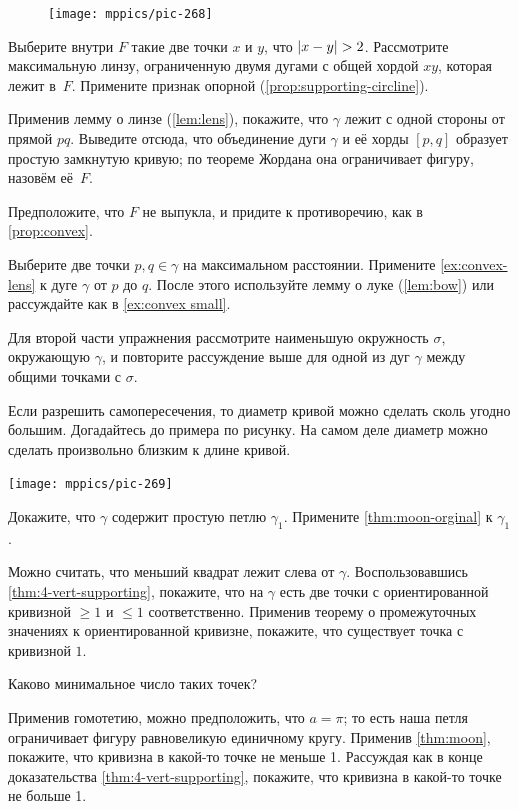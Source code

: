 \begin{multicols}{2}
\begin{figure}
\vskip-5mm
\centering
\texttt{[image: mppics/pic-268]}
\vskip0mm
\end{figure}

Выберите внутри $F$ такие две точки $x$ и $y$, что $|x\z-y|\z>2$.
Рассмотрите максимальную линзу, ограниченную двумя дугами с общей хордой $xy$, которая лежит в~$F$.
Примените признак опорной (\ref{prop:supporting-circline}).

Применив лемму о линзе (\ref{lem:lens}), покажите, что $\gamma$ лежит с одной стороны от прямой $pq$.
Выведите отсюда, что объединение дуги $\gamma$ и её хорды $[p,q]$ образует простую замкнутую кривую;
по теореме Жордана она ограничивает фигуру, назовём её~$F$.

Предположите, что $F$ не выпукла, и придите к противоречию, как в \ref{prop:convex}.

Выберите две точки $p,q\in\gamma$ на максимальном расстоянии.
Примените \ref{ex:convex-lens} к дуге $\gamma$ от $p$ до $q$.
После этого используйте лемму о луке (\ref{lem:bow}) или рассуждайте как в \ref{ex:convex small}.

Для второй части упражнения рассмотрите наименьшую окружность $\sigma$, окружающую $\gamma$, и повторите рассуждение выше для одной из дуг $\gamma$ между общими точками с $\sigma$.

Если разрешить самопересечения, то диаметр кривой можно сделать сколь угодно большим.
Догадайтесь до примера по рисунку.
На самом деле диаметр можно сделать произвольно близким к длине кривой.
\begin{Figure}
\vskip-0mm
\centering
\texttt{[image: mppics/pic-269]}
\vskip-0mm
\end{Figure}

Докажите, что $\gamma$ содержит простую петлю $\gamma_1$.
Примените \ref{thm:moon-orginal} к $\gamma_1$.

Можно считать, что меньший квадрат лежит слева от $\gamma$.
Воспользовавшись \ref{thm:4-vert-supporting}, покажите, что на $\gamma$ есть две точки с ориентированной кривизной $\ge 1$ и $\le 1$ соответственно.
Применив теорему о промежуточных значениях к ориентированной кривизне, покажите, что существует точка с кривизной $1$.

 Каково минимальное число таких точек?

Применив гомотетию, можно предположить, что $a=\pi$; то есть наша петля ограничивает фигуру равновеликую единичному кругу.
Применив \ref{thm:moon}, покажите, что кривизна в какой-то точке не меньше 1.
Рассуждая как в конце доказательства \ref{thm:4-vert-supporting}, покажите, что кривизна в какой-то точке не больше 1.


\end{multicols}
